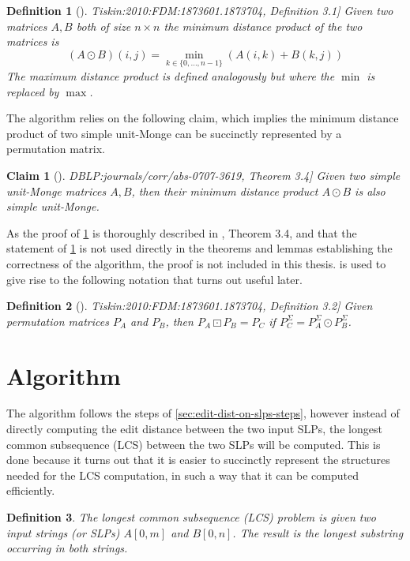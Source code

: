 \documentclass[twoside,11pt,openright]{report}
\newcommand{\str}[3]{#1[#2, #3]}
\newcommand{\refbook}[2]{\cite[#1]{DBLP:journals/corr/abs-0707-3619}, #2}
\newcommand{\reftiskin}[2]{\cite[#1]{Tiskin:2010:FDM:1873601.1873704}, #2}
\newtheorem{mydef}{Definition}
\newtheorem{claim}{Claim}
\begin{document}
\begin{mydef}[\reftiskin{p. 1289}{Definition 3.1}]
  \label{def:minimum-distance-product}
  Given two matrices $A, B$ both of size $n \times n$ the minimum distance product of the two matrices is
  \[
    (A \odot B)(i, j) = \min_{k \in \{ 0, \dots, n - 1 \}} \left( A(i, k) + B(k, j) \right)
  \]
  The maximum distance product is defined analogously but where the $\min$ is replaced by $\max$.
\end{mydef}
The algorithm relies on the following claim, which implies the minimum distance product of two simple unit-Monge can be succinctly represented by a permutation matrix.
\begin{claim}[\refbook{p. 16}{Theorem 3.4}]
  \label{claim:unit-monge-min-prod-closed}
  Given two simple unit-Monge matrices $A, B$, then their minimum distance product $A \odot B$ is also simple unit-Monge.
\end{claim}
As the proof of \cref{claim:unit-monge-min-prod-closed} is thoroughly described in \refbook{p. 16}{Theorem 3.4}, and that the statement of \cref{claim:unit-monge-min-prod-closed} is not used directly in the theorems and lemmas establishing the correctness of the algorithm, the proof is not included in this thesis.  is used to give rise to the following notation that turns out useful later.
\begin{mydef}[\reftiskin{p. 1289}{Definition 3.2}]
  Given permutation matrices $P_A$ and $P_B$, then $P_A \boxdot P_B = P_C$ if $P_C^{\Sigma} = P_A^{\Sigma} \odot P_B^{\Sigma}$.
\end{mydef}

\section{Algorithm}
The algorithm follows the steps of \cref{sec:edit-dist-on-slps-steps}, however instead of directly computing the edit distance between the two input SLPs, the longest common subsequence (LCS) between the two SLPs will be computed. This is done because it turns out that it is easier to succinctly represent the structures needed for the LCS computation, in such a way that it can be computed efficiently.

\begin{mydef}
  The longest common subsequence (LCS) problem is given two input strings (or SLPs) $\str{A}{0}{m}$ and $\str{B}{0}{n}$. The result is the longest substring occurring in both strings.
\end{mydef}
\end{document}
